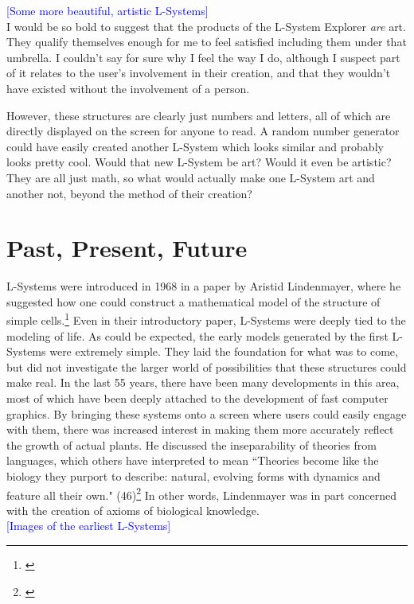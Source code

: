 \documentclass[12pt,twoside]{reedthesis}
\begin{document}
	\textcolor{blue}{[Some more beautiful, artistic L-Systems]}\\
	
	I would be so bold to suggest that the products of the L-System Explorer \textit{are} art. They qualify themselves enough for me to feel satisfied including them under that umbrella. I couldn't say for sure why I feel the way I do, although I suspect part of it relates to the user's involvement in their creation, and that they wouldn't have existed without the involvement of a person.
	
	However, these structures are clearly just numbers and letters, all of which are directly displayed on the screen for anyone to read. A random number generator could have easily created another L-System which looks similar and probably looks pretty cool. Would that new L-System be art? Would it even be artistic? They are all just math, so what would actually make one L-System art and another not, beyond the method of their creation?


\chapter{Past, Present, Future}

	L-Systems were introduced in 1968 in a paper by Aristid Lindenmayer, where he suggested how one could construct a mathematical model of the structure of simple cells.\footnote{\cite{OG1967}} Even in their introductory paper, L-Systems were deeply tied to the modeling of life. As could be expected, the early models generated by the first L-Systems were extremely simple. They laid the foundation for what was to come, but did not investigate the larger world of possibilities that these structures could make real. In the last 55 years, there have been many developments in this area, most of which have been deeply attached to the development of fast computer graphics. By bringing these systems onto a screen where users could easily engage with them, there was increased interest in making them more accurately reflect the growth of actual plants. He discussed the inseparability of theories from languages, which others have interpreted to mean ``Theories become like the biology they purport to describe: natural, evolving forms with dynamics and feature all their own." (46)\footnote{\cite{theory2004}} In other words, Lindenmayer was in part concerned with the creation of axioms of biological knowledge.\\
	
	\textcolor{blue}{[Images of the earliest L-Systems]}\\
	
\end{document}
